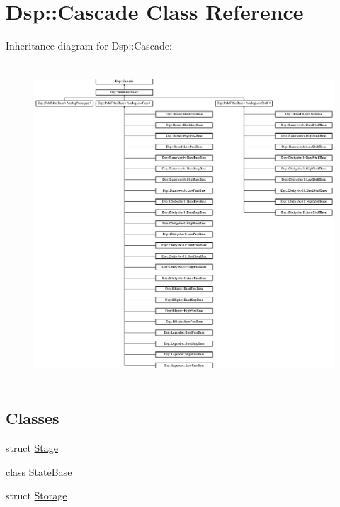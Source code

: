 \hypertarget{classDsp_1_1Cascade}{\section{Dsp\-:\-:Cascade Class Reference}
\label{classDsp_1_1Cascade}
}
Inheritance diagram for Dsp\-:\-:Cascade\-:\begin{figure}[H]
\begin{center}
\leavevmode
\includegraphics[height=12.000000cm]{classDsp_1_1Cascade}
\end{center}
\end{figure}
\subsection*{Classes}
\begin{DoxyCompactItemize}
\item 
struct \hyperlink{structDsp_1_1Cascade_1_1Stage}{Stage}
\item 
class \hyperlink{classDsp_1_1Cascade_1_1StateBase}{State\-Base}
\item 
struct \hyperlink{structDsp_1_1Cascade_1_1Storage}{Storage}
\end{DoxyCompactItemize}

